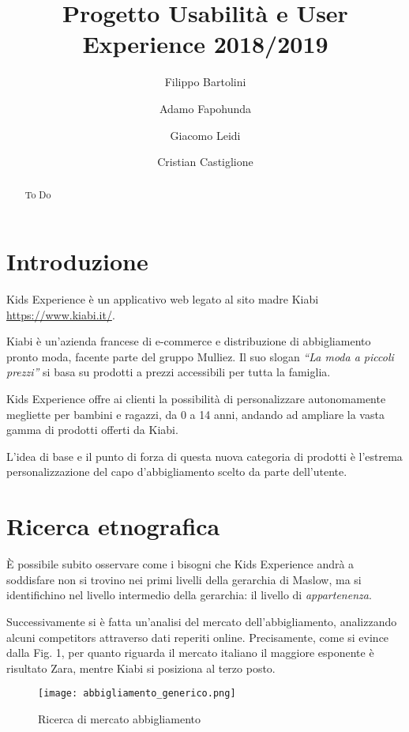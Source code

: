 \documentclass[12pt,italian,]{report}
\title{Progetto Usabilità e User Experience 2018/2019}
\author{Filippo Bartolini \and Adamo Fapohunda \and Giacomo Leidi \and Cristian Castiglione}
\date{}
\begin{document}
\maketitle
\begin{abstract}
To Do
\end{abstract}

{
\setcounter{tocdepth}{2}
\tableofcontents
}
\hypertarget{introduzione}{%
\chapter{Introduzione}\label{introduzione}}

Kids Experience è un applicativo web legato al sito madre Kiabi
\url{https://www.kiabi.it/}.

Kiabi è un'azienda francese di e-commerce e distribuzione di
abbigliamento pronto moda, facente parte del gruppo Mulliez. Il suo
slogan \emph{``La moda a piccoli prezzi''} si basa su prodotti a prezzi
accessibili per tutta la famiglia.

Kids Experience offre ai clienti la possibilità di personalizzare
autonomamente megliette per bambini e ragazzi, da 0 a 14 anni, andando
ad ampliare la vasta gamma di prodotti offerti da Kiabi.

L'idea di base e il punto di forza di questa nuova categoria di prodotti
è l'estrema personalizzazione del capo d'abbigliamento scelto da parte
dell'utente.

\hypertarget{ricerca-etnografica}{%
\chapter{Ricerca etnografica}\label{ricerca-etnografica}}

È possibile subito osservare come i bisogni che Kids Experience andrà a
soddisfare non si trovino nei primi livelli della gerarchia di Maslow,
ma si identifichino nel livello intermedio della gerarchia: il livello
di \emph{appartenenza}.

Successivamente si è fatta un'analisi del mercato dell'abbigliamento,
analizzando alcuni competitors attraverso dati reperiti online.
Precisamente, come si evince dalla Fig. 1, per quanto riguarda il
mercato italiano il maggiore esponente è risultato Zara, mentre Kiabi si
posiziona al terzo posto.

\begin{figure}
\centering
\texttt{[image: abbigliamento\_generico.png]}
\caption{Ricerca di mercato abbigliamento}
\end{figure}
\end{document}
